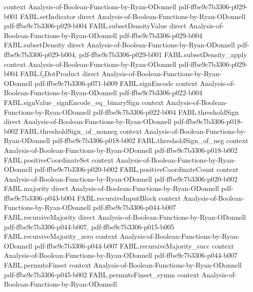 \begin{theorem}
  {context}
  {Analysis-of-Boolean-Functions-by-Ryan-ODonnell}
  {pdf-ffbe9c7b3306-p029-b001}
\proofstep
  {FABL.setIndicator}
  {direct}
  {Analysis-of-Boolean-Functions-by-Ryan-ODonnell}
  {pdf-ffbe9c7b3306-p029-b004}
\proofstep
  {FABL.subsetDensityValue}
  {direct}
  {Analysis-of-Boolean-Functions-by-Ryan-ODonnell}
  {pdf-ffbe9c7b3306-p029-b004}
\proofstep
  {FABL.subsetDensity}
  {direct}
  {Analysis-of-Boolean-Functions-by-Ryan-ODonnell}
  {pdf-ffbe9c7b3306-p029-b004,
    pdf-ffbe9c7b3306-p029-b001}
\proofstep
  {FABL.subsetDensity_apply}
  {context}
  {Analysis-of-Boolean-Functions-by-Ryan-ODonnell}
  {pdf-ffbe9c7b3306-p029-b004}
\proofstep
  {FABL.f₂DotProduct}
  {direct}
  {Analysis-of-Boolean-Functions-by-Ryan-ODonnell}
  {pdf-ffbe9c7b3306-p071-b009}
\proofstep
  {FABL.signEncode}
  {context}
  {Analysis-of-Boolean-Functions-by-Ryan-ODonnell}
  {pdf-ffbe9c7b3306-p022-b004}
\proofstep
  {FABL.signValue_signEncode_eq_binarySign}
  {context}
  {Analysis-of-Boolean-Functions-by-Ryan-ODonnell}
  {pdf-ffbe9c7b3306-p022-b004}
\proofstep
  {FABL.thresholdSign}
  {direct}
  {Analysis-of-Boolean-Functions-by-Ryan-ODonnell}
  {pdf-ffbe9c7b3306-p018-b002}
\proofstep
  {FABL.thresholdSign_of_nonneg}
  {context}
  {Analysis-of-Boolean-Functions-by-Ryan-ODonnell}
  {pdf-ffbe9c7b3306-p018-b002}
\proofstep
  {FABL.thresholdSign_of_neg}
  {context}
  {Analysis-of-Boolean-Functions-by-Ryan-ODonnell}
  {pdf-ffbe9c7b3306-p018-b002}
\proofstep
  {FABL.positiveCoordinateSet}
  {context}
  {Analysis-of-Boolean-Functions-by-Ryan-ODonnell}
  {pdf-ffbe9c7b3306-p020-b002}
\proofstep
  {FABL.positiveCoordinateCount}
  {context}
  {Analysis-of-Boolean-Functions-by-Ryan-ODonnell}
  {pdf-ffbe9c7b3306-p020-b002}
\proofstep
  {FABL.majority}
  {direct}
  {Analysis-of-Boolean-Functions-by-Ryan-ODonnell}
  {pdf-ffbe9c7b3306-p043-b004}
\proofstep
  {FABL.recursiveInputBlock}
  {context}
  {Analysis-of-Boolean-Functions-by-Ryan-ODonnell}
  {pdf-ffbe9c7b3306-p044-b007}
\proofstep
  {FABL.recursiveMajority}
  {direct}
  {Analysis-of-Boolean-Functions-by-Ryan-ODonnell}
  {pdf-ffbe9c7b3306-p044-b007,
    pdf-ffbe9c7b3306-p015-b005}
\proofstep
  {FABL.recursiveMajority_zero}
  {context}
  {Analysis-of-Boolean-Functions-by-Ryan-ODonnell}
  {pdf-ffbe9c7b3306-p044-b007}
\proofstep
  {FABL.recursiveMajority_succ}
  {context}
  {Analysis-of-Boolean-Functions-by-Ryan-ODonnell}
  {pdf-ffbe9c7b3306-p044-b007}
\proofstep
  {FABL.permuteFinset}
  {context}
  {Analysis-of-Boolean-Functions-by-Ryan-ODonnell}
  {pdf-ffbe9c7b3306-p045-b002}
\proofstep
  {FABL.permuteFinset_symm}
  {context}
  {Analysis-of-Boolean-Functions-by-Ryan-ODonnell}

\end{theorem}
